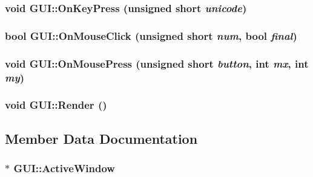 \hypertarget{class_g_u_i_a950cc3ec27839f6c06be8c4e0fe8c36}{
\subsubsection[{OnKeyPress}]{\setlength{\rightskip}{0pt plus 5cm}void GUI::OnKeyPress (unsigned short {\em unicode})}}
\label{class_g_u_i_a950cc3ec27839f6c06be8c4e0fe8c36}


\hypertarget{class_g_u_i_32678516005e48d6642f5c4b77441d09}{
\subsubsection[{OnMouseClick}]{\setlength{\rightskip}{0pt plus 5cm}bool GUI::OnMouseClick (unsigned short {\em num}, \/  bool {\em final})}}
\label{class_g_u_i_32678516005e48d6642f5c4b77441d09}


\hypertarget{class_g_u_i_10cc8065b91e81ee6c261529b41e7da8}{
\subsubsection[{OnMousePress}]{\setlength{\rightskip}{0pt plus 5cm}void GUI::OnMousePress (unsigned short {\em button}, \/  int {\em mx}, \/  int {\em my})}}
\label{class_g_u_i_10cc8065b91e81ee6c261529b41e7da8}


\hypertarget{class_g_u_i_4905ff37be14b83496d098096f5848b6}{
\subsubsection[{Render}]{\setlength{\rightskip}{0pt plus 5cm}void GUI::Render ()}}
\label{class_g_u_i_4905ff37be14b83496d098096f5848b6}




\subsection{Member Data Documentation}
\hypertarget{class_g_u_i_5dafa13d6ffc527b38a4b44070614096}{
\subsubsection[{ActiveWindow}]{$\ast$ {\bf GUI::ActiveWindow}}}
\label{class_g_u_i_5dafa13d6ffc527b38a4b44070614096}


